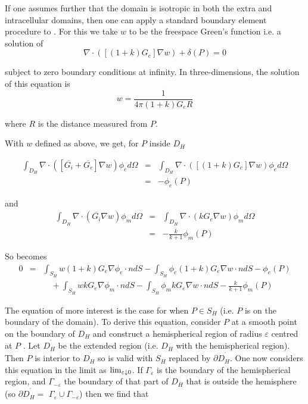 If one assumes further that the domain is isotropic in both the extra and intracellular
domains, then one can apply a standard boundary element procedure to 
. For this we take $w$ to be the freespace Green's function 
i.e. a solution of
\begin{equation}
\nabla \cdot ([(1+k)G_{e}]\nabla w)+\delta (P)=0
\label{Fundamental_soln_eqtn}
\end{equation}

subject to zero boundary conditions at infinity. In three-dimensions, the
solution of this equation is
\begin{equation}
w=\frac{1}{4\pi (1+k)G_{e}R}  \label{Fundamental_soln}
\end{equation}

where $R$ is the distance measured from $P$. 

With $w$ defined as above, we get, for $P$ inside $D_{H}$

\begin{eqnarray}
\int_{D_{H}}\nabla \cdot ([\overline{G_{i}}+\overline{G_{e}}]\nabla w)\phi
_{e}d\Omega  &=&\int_{D_{H}}\nabla \cdot ([(1+k)G_{e}]\nabla w)\phi
_{e}d\Omega   \nonumber \\
&=&-\phi _{e}(P)  \label{Volume_int_phie}
\end{eqnarray}

and 
\begin{eqnarray}
\int_{D_{H}}\nabla \cdot (\overline{G_{i}}\nabla w)\phi _{m}d\Omega 
&=&\int_{D_{H}}\nabla \cdot (kG_{e}\nabla w)\phi _{m}d\Omega   \nonumber \\
&=&-\frac{k}{k+1}\phi _{m}(P)  \label{Volume_int_phim}
\end{eqnarray}

So  becomes 
\begin{eqnarray}
0 &=&\int_{S_{H}}w(1+k)G_{e}\nabla \phi _{e}\cdot ndS-\int_{S_{H}}
        \phi_{e}(1+k)G_{e}\nabla w\cdot ndS-\phi _{e}(P)  \nonumber \\
        &&\quad +\int_{S_{H}}wkG_{e}\nabla \phi _{m}\cdot ndS-\int_{S_{H}}
        \phi_{m}kG_{e}\nabla w\cdot ndS-\frac{k}{k+1}\phi _{m}(P)
        \label{BIE_eqtn_p_inside}
\end{eqnarray}

The equation of more interest is the case for when $P\in S_{H}$ (i.e. $P$ is
on the boundary of the domain). To derive this equation, consider $P$ at a
smooth point on the
boundary of $D_{H}$ and construct a hemispherical region of radius $%
\varepsilon $ centred at $P$ . Let $D_{H}^{^{\prime }}$ be the extended
region (i.e. $D_{H}$ with the hemispherical region). Then $P$ is interior to 
$D_{H}^{^{\prime }}$ so  is valid with $S_{H}$
replaced by $\partial D_{H}^{^{\prime }}$. One now considers this equation
in the limit as $\limita{\varepsilon}{0}{}$. If $\Gamma _{\varepsilon }$
is the boundary of the hemispherical region, and $\Gamma _{-\varepsilon }$
the boundary of that part of $D_{H}$ that is outside the hemisphere (so $%
\partial D_{H}^{^{\prime }}=$ $\Gamma _{\varepsilon }\cup \Gamma
_{-\varepsilon }$) then we find that

